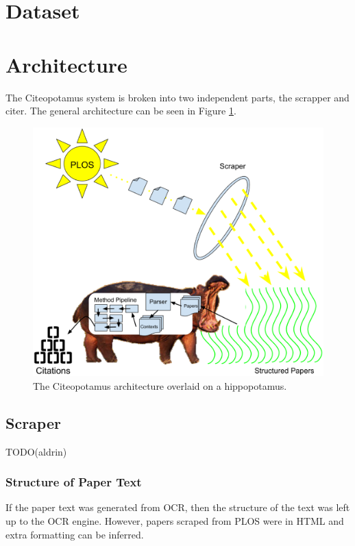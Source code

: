 \documentclass[10pt, conference, compsocconf]{IEEEtran}
\begin{document}
\section{Dataset}\label{sec:dataset}

\section{Architecture}\label{sec:architecture}
The Citeopotamus system is broken into two independent parts, the scrapper and citer.
The general architecture can be seen in Figure \ref{fig:arch}.

\begin{figure}[ht]
   \includegraphics[width=\textwidth px]{images/arch.eps}
        \caption{The Citeopotamus architecture overlaid on a hippopotamus.}
        \label{fig:arch}
\end{figure}

\subsection{Scraper}
TODO(aldrin)

\subsubsection{Structure of Paper Text}
If the paper text was generated from OCR, then the structure of the text was left up to the OCR engine.
However, papers scraped from PLOS were in HTML and extra formatting can be inferred.
\end{document}
